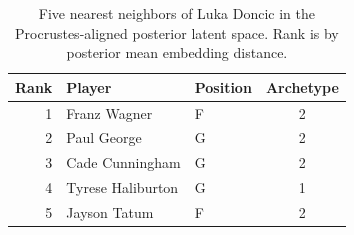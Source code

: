 \begin{table}[htbp]
  \centering\small
  \begin{tabular}{rllc}
    \toprule
    Rank & Player & Position & Archetype \\
    \midrule
    1 & Franz Wagner & F & 2 \\
    2 & Paul George & G & 2 \\
    3 & Cade Cunningham & G & 2 \\
    4 & Tyrese Haliburton & G & 1 \\
    5 & Jayson Tatum & F & 2 \\
    \bottomrule
  \end{tabular}
  \caption{Five nearest neighbors of Luka Doncic in the Procrustes-aligned posterior latent space. Rank is by posterior mean embedding distance.}
  \label{tab:Luka_Doncic_neighbors}
\end{table}

